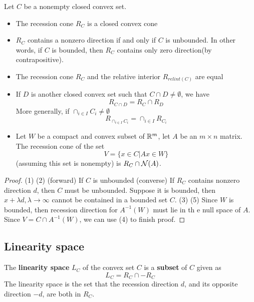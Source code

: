 \begin{refsection}
\begin{theorem}\cite[45]{bertsekas2009convex}
Let $C$ be a nonempty closed convex set.
\begin{itemize}
    \item The recession cone $R_C$ is a closed convex cone
    \item $R_C$ contains a nonzero direction if and only if $C$ is unbounded. In other words, if $C$ is bounded, then $R_C$ contains only zero direction(by contrapositive).
    \item The recession cone $R_C$ and the relative interior $R_{relint(C)}$ are equal
    \item If $D$ is another closed convex set such that $C\cap D \neq \emptyset$, we have
    $$R_{C\cap D} =R_C \cap R_D$$
    More generally, if $\cap_{i\in I} C_i \neq \emptyset$
    $$R_{\cap_{i\in I} C_i} = \cap_{i\in I}R_{C_i}$$
    \item Let $W$ be a compact and convex subset of $\mathbb{R}^m$, let $A$ be an $m\times n$ matrix. The recession cone of the set 
    $$V=\{x\in C| Ax \in W\}$$
    (assuming this set is nonempty) is $R_C \cap \mathcal{N}(A)$.                   
\end{itemize}
\end{theorem}
\begin{proof}
(1)
(2) (forward) If $C$ is unbounded (converse) If $R_C$ contains nonzero direction $d$, then $C$ must be unbounded. Suppose it is bounded, then $x + \lambda d,\lambda \to \infty$ cannot be contained in a bounded set $C$. 
(3) 
(5) Since $W$ is bounded, then recession direction for $A^{-1}(W)$ must lie in th e null space of $A$. Since $V = C\cap A^{-1}(W)$, we can use (4) to finish proof.
\end{proof}




\subsection{Linearity space}
\begin{definition}
The \textbf{linearity space} $L_C$ of the convex set $C$ is a \textbf{subset} of $C$ given as 
$$L_C = R_C \cap -R_C$$
The linearity space is the set that the recession direction $d$, and its opposite direction $-d$, are both in $R_C$.
\end{definition}



\end{refsection}
